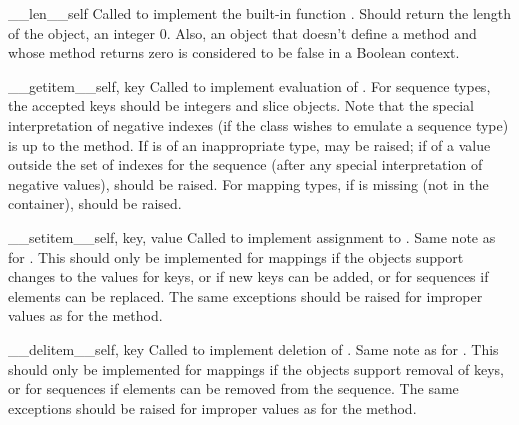 \begin{methoddesc}{__len__}{self}
Called to implement the built-in function
.  Should return the length of the
object, an integer \code{>=} 0.  Also, an object that doesn't define a
 method and whose  method
returns zero is considered to be false in a Boolean context.
\end{methoddesc}

\begin{methoddesc}{__getitem__}{self, key}
Called to implement evaluation of .
For sequence types, the accepted keys should be integers and slice
objects.  Note that
the special interpretation of negative indexes (if the class wishes to
emulate a sequence type) is up to the  method.
If  is of an inappropriate type,  may be
raised; if of a value outside the set of indexes for the sequence
(after any special interpretation of negative values),
 should be raised.
For mapping types, if  is missing (not in the container),
 should be raised.                     
\end{methoddesc}

\begin{methoddesc}{__setitem__}{self, key, value}
Called to implement assignment to .  Same
note as for .  This should only be implemented
for mappings if the objects support changes to the values for keys, or
if new keys can be added, or for sequences if elements can be
replaced.  The same exceptions should be raised for improper
 values as for the  method.
\end{methoddesc}

\begin{methoddesc}{__delitem__}{self, key}
Called to implement deletion of .  Same
note as for .  This should only be implemented
for mappings if the objects support removal of keys, or for sequences
if elements can be removed from the sequence.  The same exceptions
should be raised for improper  values as for the
 method.
\end{methoddesc}

